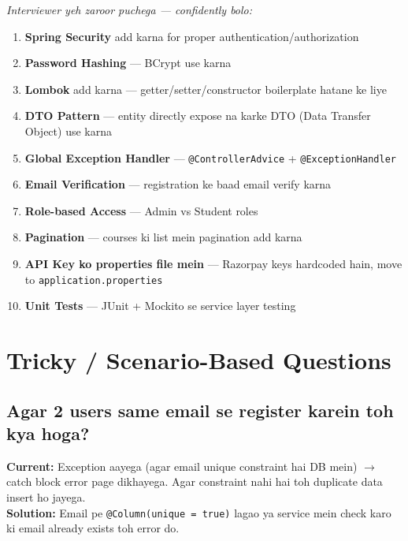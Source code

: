 \documentclass[12pt,a4paper]{article}
\begin{document}
\begin{warnbox}
\textit{Interviewer yeh zaroor puchega --- confidently bolo:}
\end{warnbox}

\begin{answerbox}
\begin{enumerate}
    \item \textbf{Spring Security} add karna for proper authentication/authorization
    \item \textbf{Password Hashing} --- BCrypt use karna
    \item \textbf{Lombok} add karna --- getter/setter/constructor boilerplate hatane ke liye
    \item \textbf{DTO Pattern} --- entity directly expose na karke DTO (Data Transfer Object) use karna
    \item \textbf{Global Exception Handler} --- \texttt{@ControllerAdvice} + \texttt{@ExceptionHandler}
    \item \textbf{Email Verification} --- registration ke baad email verify karna
    \item \textbf{Role-based Access} --- Admin vs Student roles
    \item \textbf{Pagination} --- courses ki list mein pagination add karna
    \item \textbf{API Key ko properties file mein} --- Razorpay keys hardcoded hain, move to \texttt{application.properties}
    \item \textbf{Unit Tests} --- JUnit + Mockito se service layer testing
\end{enumerate}
\end{answerbox}

\section{Tricky / Scenario-Based Questions}

\setcounter{subsection}{30}

\subsection{Agar 2 users same email se register karein toh kya hoga?}

\begin{answerbox}
\textbf{Current:} Exception aayega (agar email unique constraint hai DB mein) $\rightarrow$ catch block error page dikhayega. Agar constraint nahi hai toh duplicate data insert ho jayega.\\[5pt]
\textbf{Solution:} Email pe \texttt{@Column(unique = true)} lagao ya service mein check karo ki email already exists toh error do.
\end{answerbox}
\end{document}
